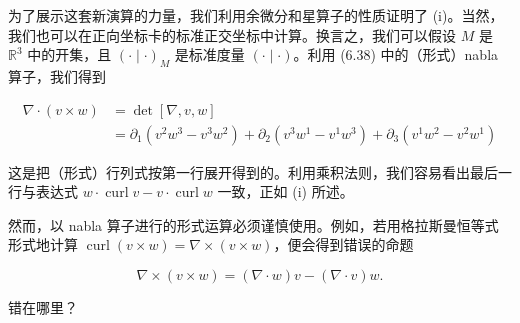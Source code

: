 为了展示这套新演算的力量，我们利用余微分和星算子的性质证明了 (i)。当然，我们也可以在正向坐标卡的标准正交坐标中计算。换言之，我们可以假设 $ M $ 是 $ \mathbb{R}^{3} $ 中的开集，且 $ (\cdot\mid\cdot)_{M} $ 是标准度量 $ (\cdot\mid\cdot) $。利用 (6.38) 中的（形式）nabla 算子，我们得到

\begin{equation*}
\begin{aligned}
\nabla\cdot(v\times w) &= \det[\nabla, v, w] \\ &= \partial_{1}(v^{2}w^{3} - v^{3}w^{2}) + \partial_{2}(v^{3}w^{1} - v^{1}w^{3}) + \partial_{3}(v^{1}w^{2} - v^{2}w^{1})
\end{aligned}
\end{equation*}

这是把（形式）行列式按第一行展开得到的。利用乘积法则，我们容易看出最后一行与表达式 $ w\cdot\operatorname{curl} v - v\cdot\operatorname{curl} w $ 一致，正如 (i) 所述。

然而，以 nabla 算子进行的形式运算必须谨慎使用。例如，若用格拉斯曼恒等式形式地计算 $ \operatorname{curl}(v \times w) = \nabla \times (v \times w) $，便会得到错误的命题

\[
\nabla \times (v \times w) = (\nabla \cdot w)v - (\nabla \cdot v)w .
\]

错在哪里？

\exerciseshead

